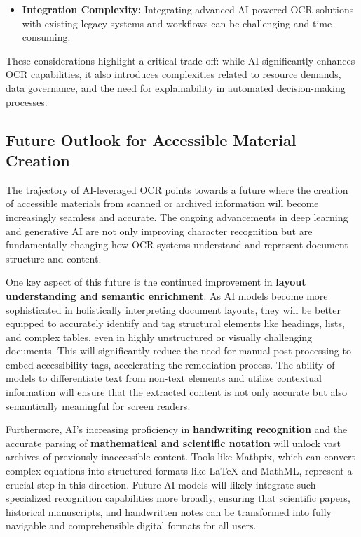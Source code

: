 \begin{itemize}
    \item \textbf{Integration Complexity:} Integrating advanced AI-powered OCR solutions with existing legacy systems and workflows can be challenging and time-consuming.
\end{itemize}

These considerations highlight a critical trade-off: while AI significantly enhances OCR capabilities, it also introduces complexities related to resource demands, data governance, and the need for explainability in automated decision-making processes.

\subsection{Future Outlook for Accessible Material Creation}

The trajectory of AI-leveraged OCR points towards a future where the creation of accessible materials from scanned or archived information will become increasingly seamless and accurate. The ongoing advancements in deep learning and generative AI are not only improving character recognition but are fundamentally changing how OCR systems understand and represent document structure and content.

One key aspect of this future is the continued improvement in \textbf{layout understanding and semantic enrichment}. As AI models become more sophisticated in holistically interpreting document layouts, they will be better equipped to accurately identify and tag structural elements like headings, lists, and complex tables, even in highly unstructured or visually challenging documents. This will significantly reduce the need for manual post-processing to embed accessibility tags, accelerating the remediation process. The ability of models to differentiate text from non-text elements and utilize contextual information will ensure that the extracted content is not only accurate but also semantically meaningful for screen readers.

Furthermore, AI's increasing proficiency in \textbf{handwriting recognition} and the accurate parsing of \textbf{mathematical and scientific notation} will unlock vast archives of previously inaccessible content. Tools like Mathpix, which can convert complex equations into structured formats like LaTeX and MathML, represent a crucial step in this direction. Future AI models will likely integrate such specialized recognition capabilities more broadly, ensuring that scientific papers, historical manuscripts, and handwritten notes can be transformed into fully navigable and comprehensible digital formats for all users.

